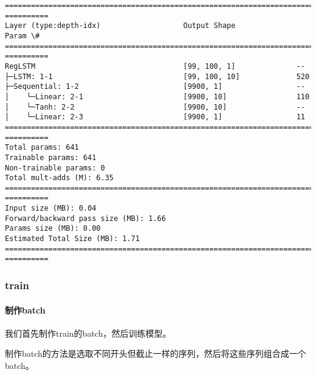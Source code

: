 \documentclass[11pt]{article}
\makeatletter
\newcommand{\boxspacing}{\kern\kvtcb@left@rule\kern\kvtcb@boxsep}
\newcommand{\prompt}[4]{
        {\ttfamily\llap{{\color{#2}[#3]:\hspace{3pt}#4}}\vspace{-\baselineskip}}
    }
\makeatother
\begin{document}
            \begin{tcolorbox}[breakable, size=fbox, boxrule=.5pt, pad at break*=1mm, opacityfill=0]
\prompt{Out}{outcolor}{16}{\boxspacing}
\begin{Verbatim}[commandchars=\\\{\}]
================================================================================
==========
Layer (type:depth-idx)                   Output Shape              Param \#
================================================================================
==========
RegLSTM                                  [99, 100, 1]              --
├─LSTM: 1-1                              [99, 100, 10]             520
├─Sequential: 1-2                        [9900, 1]                 --
│    └─Linear: 2-1                       [9900, 10]                110
│    └─Tanh: 2-2                         [9900, 10]                --
│    └─Linear: 2-3                       [9900, 1]                 11
================================================================================
==========
Total params: 641
Trainable params: 641
Non-trainable params: 0
Total mult-adds (M): 6.35
================================================================================
==========
Input size (MB): 0.04
Forward/backward pass size (MB): 1.66
Params size (MB): 0.00
Estimated Total Size (MB): 1.71
================================================================================
==========
\end{Verbatim}
\end{tcolorbox}
        
    \hypertarget{train}{%
\subsubsection{train}\label{train}}

    \hypertarget{ux5236ux4f5cbatch}{%
\paragraph{制作batch}\label{ux5236ux4f5cbatch}}

\begin{center}
\end{center}

我们首先制作train的batch，然后训练模型。

制作batch的方法是选取不同开头但截止一样的序列，然后将这些序列组合成一个batch。
\end{document}
